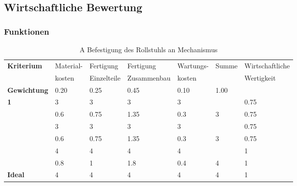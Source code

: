 \documentclass[10pt,a4paper]{article}
\begin{document}
\subsection{Wirtschaftliche Bewertung}
\subsubsection{Funktionen}





\begin{table}[h!]
    \centering
    \hspace*{0in} %
    \begin{tabular}{>{\bfseries}p{2cm} p{2.2cm} p{2cm} p{2cm} p{2.5cm} p{2cm} p{2cm}}
        \toprule
        Kriterium  & Material- & Fertigung   & Fertigung   & Wartungs- & Summe & Wirtschaftliche \\
                   & kosten    & Einzelteile & Zusammenbau & kosten    &       & Wertigkeit      \\
        \midrule
        Gewichtung & 0.20      & 0.25        & 0.45        & 0.10      & 1.00  &                 \\
        \midrule
        1          & 3         & 3           & 3           & 3         &       & 0.75            \\
                   & 0.6       & 0.75        & 1.35        & 0.3       & 3     & 0.75            \\
        \addlinespace
        2          & 3         & 3           & 3           & 3         &       & 0.75            \\
                   & 0.6       & 0.75        & 1.35        & 0.3       & 3     & 0.75            \\
        \addlinespace
        3          & 4         & 4           & 4           & 4         &       & 1               \\
                   & 0.8       & 1           & 1.8         & 0.4       & 4     & 1               \\
        \addlinespace
        Ideal      & 4         & 4           & 4           & 4         & 4     & 1               \\
        \bottomrule
    \end{tabular}
    \caption{A Befestigung des Rollstuhls an Mechanismus}
    \label{tab:befestigung}
\end{table}
\end{document}
